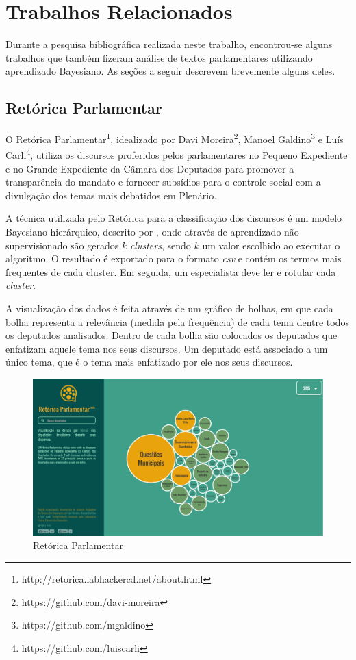 \section{Trabalhos Relacionados}

Durante a pesquisa bibliográfica realizada neste trabalho, encontrou-se alguns trabalhos que também fizeram análise de textos parlamentares utilizando aprendizado Bayesiano. As seções a seguir descrevem brevemente alguns deles.

\subsection{Retórica Parlamentar}

O Retórica Parlamentar\footnote{http://retorica.labhackercd.net/about.html}, idealizado por Davi Moreira\footnote{https://github.com/davi-moreira}, Manoel Galdino\footnote{https://github.com/mgaldino} e Luís Carli\footnote{https://github.com/luiscarli}, utiliza os discursos proferidos pelos parlamentares no Pequeno Expediente e no Grande Expediente da Câmara dos Deputados para promover a transparência do mandato e fornecer subsídios para o controle social com a divulgação dos temas mais debatidos em Plenário.

A técnica utilizada pelo Retórica para a classificação dos discursos é um modelo Bayesiano hierárquico, descrito por , onde através de aprendizado não supervisionado são gerados \(k\) \textit{clusters}, sendo \(k\) um valor escolhido ao executar o algoritmo. O resultado é exportado para o formato \textit{csv} e contém os termos mais frequentes de cada cluster. Em seguida, um especialista deve ler e rotular cada \textit{cluster}.

A visualização dos dados é feita através de um gráfico de bolhas, em que cada bolha representa a relevância (medida pela frequência) de cada tema dentre todos os deputados analisados. Dentro de cada bolha são colocados os deputados que enfatizam aquele tema nos seus discursos. Um deputado está associado a um único tema, que é o tema mais enfatizado por ele nos seus discursos.

\begin{figure}[h]
    \centering
    \includegraphics[scale=0.3]{figuras/retorica.eps}
    \caption{Retórica Parlamentar}
\end{figure}


